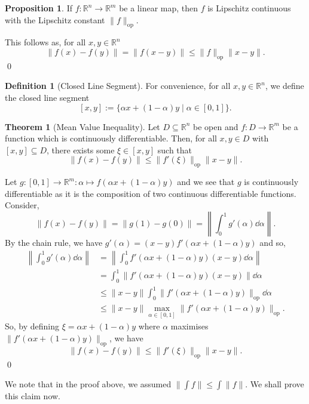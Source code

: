 \documentclass[
]{article}
\theoremstyle{definition}
\newtheorem{theorem}{Theorem}
\newtheorem{prop}{Proposition}
\theoremstyle{definition}
\newtheorem{definition}{Definition}[section]
\begin{document}
\begin{prop}
  If \(f : \mathbb{R}^n \to \mathbb{R}^m\) be a linear map, then \(f\) is Lipschitz 
  continuous with the Lipschitz constant \(\|f\|_\text{op}\).
\end{prop}
\proof

This follows as, for all \(x, y \in \mathbb{R}^n\)
\[\|f(x) - f(y)\| = \| f(x - y) \| \le \|f\|_\text{op} \|x - y\|.\] \qed

\begin{definition}[Closed Line Segment]
  For convenience, for all \(x, y \in \mathbb{R}^n\), we define the closed line 
  segment 
  \[[x, y] := \{\alpha x + (1 - \alpha)y \mid \alpha \in [0, 1]\}.\]
\end{definition}

\begin{theorem}[Mean Value Inequality]
  Let \(D \subseteq \mathbb{R}^n\) be open and \(f : D \to \mathbb{R}^m\) be a 
  function which is continuously differentiable. Then, for all \(x, y \in D\) 
  with \([x, y] \subseteq D\), there exists some \(\xi \in [x, y]\) such that 
  \[\| f(x) - f(y)\| \le \|f'(\xi)\|_\text{op} \|x - y\|.\]
\end{theorem}
\proof

Let
\(g : [0, 1] \to \mathbb{R}^m : \alpha \mapsto f(\alpha x + (1 - \alpha) y)\)
and we see that \(g\) is continuously differentiable as it is the
composition of two continuous differentiable functions. Consider,
\[\| f(x) - f(y)\| = \|g(1) - g(0)\| = \left\| \int_0^1 g'(\alpha) \dd \alpha\right\|.\]
By the chain rule, we have
\(g'(\alpha) = (x - y) f'(\alpha x +(1 - \alpha)y)\) and so,
\[\begin{split}
    \left\| \int_0^1 g'(\alpha) \dd \alpha\right\| 
      & = \left\| \int_0^1 f'(\alpha x +(1 - \alpha)y) (x - y) \dd \alpha \right\|\\
      & = \int_0^1 \| f'(\alpha x +(1 - \alpha)y) (x - y) \| \dd \alpha\\
      & \le \|x - y\| \int_0^1 \| f'(\alpha x +(1 - \alpha)y) \|_\text{op} \dd \alpha\\
      & \le \|x - y\| \max_{\alpha \in [0, 1]} \| f'(\alpha x +(1 - \alpha)y) \|_\text{op}.
  \end{split}\] So, by defining \(\xi = \alpha x +(1 - \alpha)y\) where
\(\alpha\) maximises \(\| f'(\alpha x +(1 - \alpha)y) \|_\text{op}\), we
have \[\| f(x) - f(y)\| \le \|f'(\xi)\|_\text{op} \|x - y\|.\] \qed

We note that in the proof above, we assumed
\(\|\int f\| \le \int \|f\|\). We shall prove this claim now.
\end{document}
